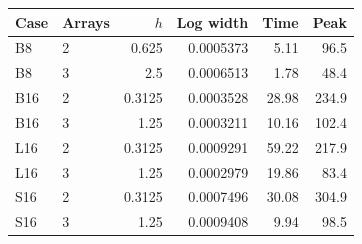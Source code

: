 \begin{tabular}{llrrrr}\toprule
Case & Arrays & $h$ & Log width & Time & Peak\\\midrule
B8 & 2 & 0.625 & 0.0005373 & 5.11 & 96.5 \\
B8 & 3 & 2.5 & 0.0006513 & 1.78 & 48.4 \\
B16 & 2 & 0.3125 & 0.0003528 & 28.98 & 234.9 \\
B16 & 3 & 1.25 & 0.0003211 & 10.16 & 102.4 \\
L16 & 2 & 0.3125 & 0.0009291 & 59.22 & 217.9 \\
L16 & 3 & 1.25 & 0.0002979 & 19.86 & 83.4 \\
S16 & 2 & 0.3125 & 0.0007496 & 30.08 & 304.9 \\
S16 & 3 & 1.25 & 0.0009408 & 9.94 & 98.5 \\
\bottomrule\end{tabular}
